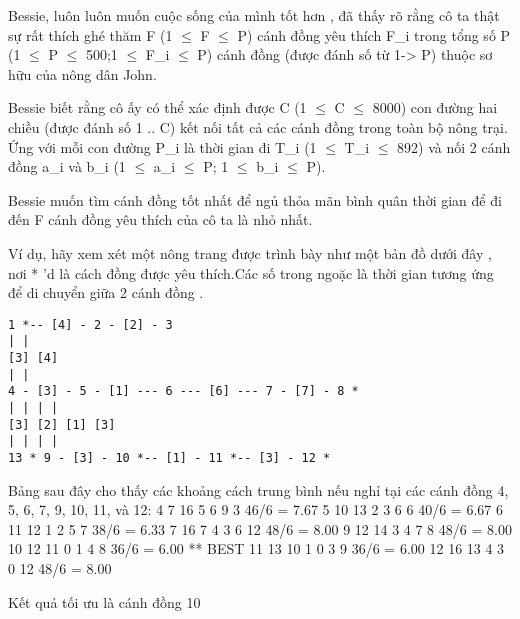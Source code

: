 Bessie, luôn luôn muốn cuộc sống của mình tốt hơn , đã thấy rõ rằng cô ta thật sự rất thích ghé thăm F (1  $\le$  F  $\le$  P) cánh đồng yêu thích F\_i trong tổng số P (1  $\le$  P  $\le$  500;1  $\le$  F\_i  $\le$  P) cánh đồng (được đánh số từ 1-> P) thuộc sơ hữu của nông dân John.  

   Bessie biết rằng cô ấy có thể xác định được C (1  $\le$  C  $\le$  8000) con đường hai chiều (được đánh số 1 .. C) kết nối tất cả các cánh đồng trong toàn bộ nông trại. Ứng với mỗi con đường P\_i là thời gian đi T\_i (1  $\le$  T\_i  $\le$  892) và nối 2 cánh đồng a\_i và b\_i (1  $\le$  a\_i  $\le$  P; 1  $\le$  b\_i  $\le$  P).  

   Bessie muốn tìm cánh đồng tốt nhất để ngủ thỏa mãn bình quân thời gian để đi đến F cánh đồng yêu thích của cô ta là nhỏ nhất.  

   Ví dụ, hãy xem xét một nông trang được trình bày như một bản đồ dưới đây , nơi * 'd là cách đồng được yêu thích.Các số trong ngoặc là thời gian tương ứng để di chuyển giữa 2 cánh đồng .  
\begin{verbatim}
1 *-- [4] - 2 - [2] - 3
| |
[3] [4]
| |
4 - [3] - 5 - [1] --- 6 --- [6] --- 7 - [7] - 8 *
| | | |
[3] [2] [1] [3]
| | | |
13 * 9 - [3] - 10 *-- [1] - 11 *-- [3] - 12 *
\end{verbatim}

   Bảng sau đây cho thấy các khoảng cách trung bình nếu nghỉ tại các cánh đồng 4, 5, 6, 7, 9, 10, 11, và 12: 4 7 16 5 6 9 3 46/6 = 7.67 5 10 13 2 3 6 6 40/6 = 6.67 6 11 12 1 2 5 7 38/6 = 6.33 7 16 7 4 3 6 12 48/6 = 8.00 9 12 14 3 4 7 8 48/6 = 8.00 10 12 11 0 1 4 8 36/6 = 6.00 ** BEST 11 13 10 1 0 3 9 36/6 = 6.00 12 16 13 4 3 0 12 48/6 = 8.00  

   Kết quả tối ưu là cánh đồng 10